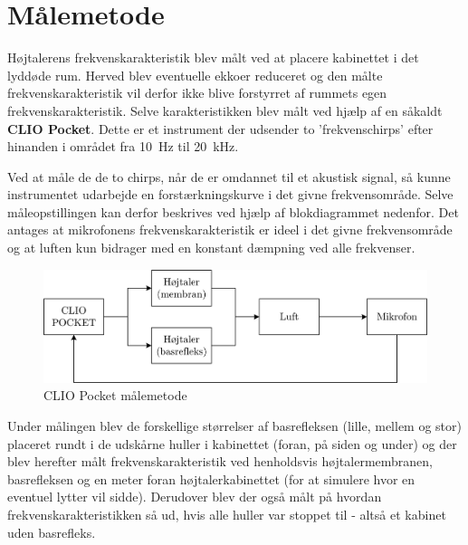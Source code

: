 \chapter{Målemetode}
\label{ch:measurements}
Højtalerens frekvenskarakteristik blev målt ved at placere kabinettet i det lyddøde rum. Herved blev eventuelle ekkoer reduceret og den målte frekvenskarakteristik vil derfor ikke blive forstyrret af rummets egen frekvenskarakteristik. Selve karakteristikken blev målt ved hjælp af en såkaldt \textbf{CLIO Pocket}. Dette er et instrument der udsender to 'frekvenschirps' efter hinanden i området fra \SI{10}{\hertz} til \SI{20}{\kilo\hertz}.

Ved at måle de de to chirps, når de er omdannet til et akustisk signal, så kunne instrumentet udarbejde en forstærkningskurve i det givne frekvensområde. Selve måleopstillingen kan derfor beskrives ved hjælp af blokdiagrammet nedenfor. Det antages at mikrofonens frekvenskarakteristik er ideel i det givne frekvensområde og at luften kun bidrager med en konstant dæmpning ved alle frekvenser. 
\begin{figure}[H]
	\centering
	\includegraphics[width=\textwidth]{Pics/CLIOFeedback}
	\caption{CLIO Pocket målemetode}
\end{figure}

Under målingen blev de forskellige størrelser af basrefleksen (lille, mellem og stor) placeret rundt i de udskårne huller i kabinettet (foran, på siden og under) og der blev herefter målt frekvenskarakteristik ved henholdsvis højtalermembranen, basrefleksen og en meter foran højtalerkabinettet (for at simulere hvor en eventuel lytter vil sidde). Derudover blev der også målt på hvordan frekvenskarakteristikken så ud, hvis alle huller var stoppet til - altså et kabinet uden basrefleks. 